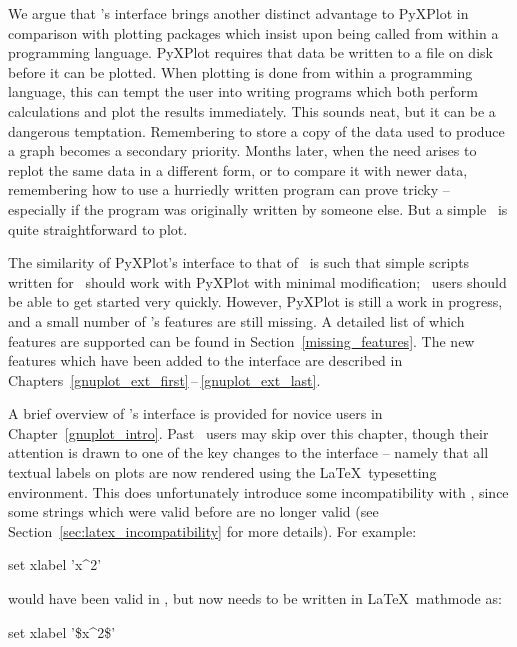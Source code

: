 We argue that \gnuplot's interface brings another distinct advantage to PyXPlot
in comparison with plotting packages which insist upon being called from within
a programming language. PyXPlot requires that data be written to a file on disk
before it can be plotted. When plotting is done from within a programming
language, this can tempt the user into writing programs which both perform
calculations and plot the results immediately.  This sounds neat, but it can be
a dangerous temptation. Remembering to store a copy of the data used to produce
a graph becomes a secondary priority.  Months later, when the need arises to
replot the same data in a different form, or to compare it with newer data,
remembering how to use a hurriedly written program can prove tricky --
especially if the program was originally written by someone else. But a simple
\datafile\ is quite straightforward to plot.

The similarity of PyXPlot's interface to that of \gnuplot\ is such that simple
scripts written for \gnuplot\ should work with PyXPlot with minimal
modification; \gnuplot\ users should be able to get started very quickly.
However, PyXPlot is still a work in progress, and a small number of \gnuplot's
features are still missing.  A detailed list of which features are supported
can be found in Section~\ref{missing_features}. The new features which have
been added to the interface are described in
Chapters~\ref{gnuplot_ext_first}\,--\,\ref{gnuplot_ext_last}.

A brief overview of \gnuplot's interface is provided for novice users in
Chapter~\ref{gnuplot_intro}. Past \gnuplot\ users may skip over this chapter,
though their attention is drawn to one of the key changes to the interface --
namely that all textual labels on plots are now rendered using the \LaTeX\
typesetting environment. This does unfortunately introduce some incompatibility
with \gnuplot, since some strings which were valid before are no longer valid
(see Section~\ref{sec:latex_incompatibility} for more details). For
example:\index{latex}

\begin{dontdo}
set xlabel 'x\^{}2'
\end{dontdo}

\noindent would have been valid in \gnuplot, but now needs to be written in
\LaTeX\ mathmode as:

\begin{dodo}
set xlabel '\$x\^{}2\$'
\end{dodo}


